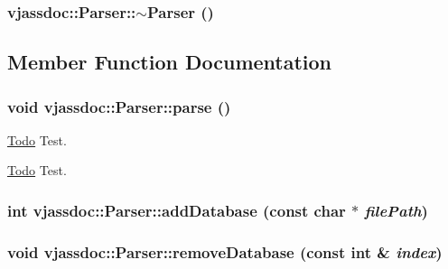 \hypertarget{classvjassdoc_1_1Parser_168d8430293c2ee5f66a94e95c2feccb}{
\subsubsection{\setlength{\rightskip}{0pt plus 5cm}vjassdoc::Parser::$\sim$Parser ()}}
\label{classvjassdoc_1_1Parser_168d8430293c2ee5f66a94e95c2feccb}




\subsection{Member Function Documentation}
\hypertarget{classvjassdoc_1_1Parser_25594f25b429a8ff7a4ed426ee0f3184}{
\subsubsection{\setlength{\rightskip}{0pt plus 5cm}void vjassdoc::Parser::parse ()}}
\label{classvjassdoc_1_1Parser_25594f25b429a8ff7a4ed426ee0f3184}




\begin{Desc}
\item[\hyperlink{todo__todo000006}{Todo}]Test. \end{Desc}


\begin{Desc}
\item[\hyperlink{todo__todo000006}{Todo}]Test. \end{Desc}
\hypertarget{classvjassdoc_1_1Parser_919b030073a5008b4e7e8d467258adb3}{
\subsubsection{\setlength{\rightskip}{0pt plus 5cm}int vjassdoc::Parser::addDatabase (const char $\ast$ {\em filePath})}}
\label{classvjassdoc_1_1Parser_919b030073a5008b4e7e8d467258adb3}


\hypertarget{classvjassdoc_1_1Parser_389d28f9b81aa6a9c40d6d55e7c518a1}{
\subsubsection{\setlength{\rightskip}{0pt plus 5cm}void vjassdoc::Parser::removeDatabase (const int \& {\em index})}}
\label{classvjassdoc_1_1Parser_389d28f9b81aa6a9c40d6d55e7c518a1}


